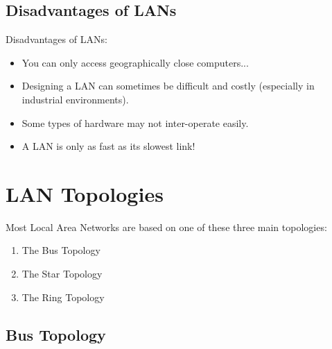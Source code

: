 \documentclass{beamer}[10pt, usepdftitle=false, handout]
\begin{document}
	\subsection{Disadvantages of LANs}	
	
	\begin{frame}
	
	Disadvantages of LANs:
	\vspace*{1em}	
	
	\begin{itemize}
	
	\item{You can only access geographically close computers...}
	\item{Designing a LAN can sometimes be difficult and costly (especially in industrial environments).}
	\item{Some types of hardware may not inter-operate easily.}
	\item{A LAN is only as fast as its slowest link!}	
	
	\end{itemize}		
		
	\end{frame}	
	
	\section{LAN Topologies}
		
	\begin{frame}
	
	Most Local Area Networks are based on one of these three main topologies:
	\vspace*{1em}	
	
	\begin{enumerate}
	\item{The Bus Topology}
	\item{The Star Topology}
	\item{The Ring Topology}
	\end{enumerate}		
	
	\end{frame}		
		
	\subsection{Bus Topology}		
		
\end{document}

